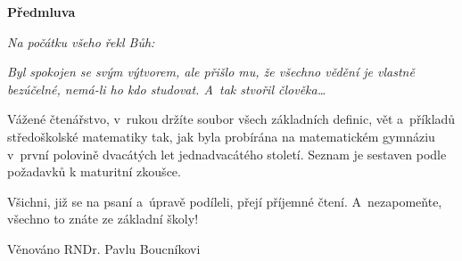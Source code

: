 
\clearpage
{}
{}
\begin{adjustwidth}{0.1\textwidth}{0.1\textwidth}
\begingroup
\null\vspace{0.2\textheight}
\begin{center}
{\bfseries\Large Předmluva}\par\vspace{2em}
\end{center}

\textit{Na počátku všeho řekl Bůh:}
\begin{center}
\end{center}
\textit{Byl spokojen se svým výtvorem, ale přišlo mu, že všechno vědění je vlastně
bezúčelné, nemá-li ho kdo studovat. A~tak stvořil člověka\dots}

\par Vážené čtenářstvo, v~rukou držíte soubor všech základních definic, vět
a~příkladů středoškolské matematiky tak, jak byla probírána na matematickém gymnáziu
v~první polovině dvacátých let jednadvacátého století. Seznam je sestaven podle
požadavků k maturitní zkoušce.
\par Všichni, již se na psaní a~úpravě podíleli, přejí příjemné čtení. A~nezapomeňte,
všechno to znáte ze základní školy!


\hfill Věnováno RNDr. Pavlu Boucníkovi
\endgroup
\end{adjustwidth}
\clearpage
